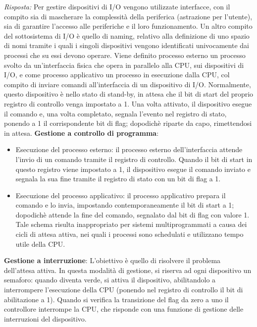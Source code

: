 \documentclass{article}
\newenvironment{solution}
    {\textit{Risposta:}}
    {}
\begin{document}
\begin{solution}
Per gestire dispositivi di I/O vengono utilizzate interfacce, con il compito sia di mascherare la complessità della periferica (astrazione per l’utente), sia di garantire l’accesso alle periferiche e il loro funzionamento.
\newline
\newline
Un altro compito del sottosistema di I/O è quello di naming, relativo alla definizione di uno spazio di nomi tramite i quali i singoli dispositivi vengono identificati univocamente dai processi che su essi devono operare.
\newline
Viene definito processo esterno un processo svolto da un’interfaccia fisica che opera in parallelo alla CPU, sui dispositivi di I/O, e come processo applicativo un processo in esecuzione dalla CPU, col compito di inviare comandi all’interfaccia di un dispositivo di I/O.
\newline
Normalmente, questo dispositivo è nello stato di stand-by, in attesa che il bit di start del proprio registro di controllo venga impostato a 1.
\newline
Una volta attivato, il dispositivo esegue il comando e, una volta completato, segnala l'evento nel registro di stato, ponendo a 1 il corrispondente bit di flag; dopodichè riparte da capo, rimettendosi in attesa.
\newline
\newline
\textbf{Gestione a controllo di programma}:
\begin{itemize}
    \item Esecuzione del processo esterno: il processo esterno dell’interfaccia attende l’invio di un comando tramite il registro di controllo. Quando il bit di start in questo registro viene impostato a 1, il dispositivo esegue il comando inviato e segnala la sua fine tramite il registro di stato con un bit di flag a 1.
    \item Esecuzione del processo applicativo: il processo applicativo prepara il comando e lo invia, impostando contemporaneamente il bit di start a 1; dopodichè attende la fine del comando, segnalato dal bit di flag con valore 1.
    \newline
    Tale schema risulta inappropriato per sistemi multiprogrammati a causa dei cicli di attesa attiva, nei quali i processi sono schedulati e utilizzano tempo utile della CPU.
\end{itemize}
\textbf{Gestione a interruzione}:
\newline
L’obiettivo è quello di risolvere il problema dell’attesa attiva.
\newline
In questa modalità di gestione, si riserva ad ogni dispositivo un semaforo: quando diventa verde, si attiva il dispositivo, abilitandolo a interrompere l’esecuzione della CPU (ponendo nel registro di controllo il bit di abilitazione a 1).
\newline
Quando si verifica la transizione del flag da zero a uno il controllore interrompe la CPU, che risponde con una funzione di gestione delle interruzioni del dispositivo.
\end{solution}
\end{document}
